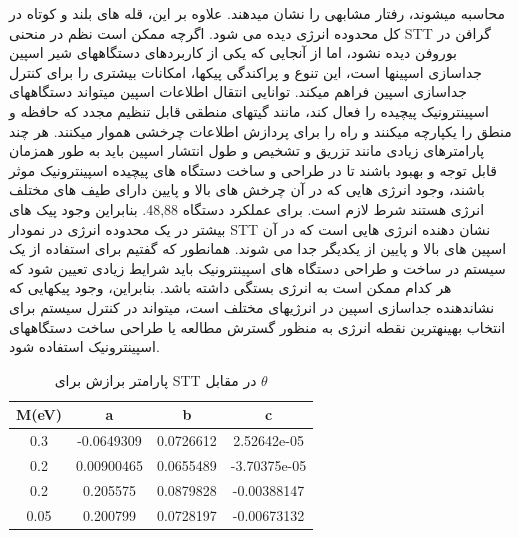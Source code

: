 محاسبه میشوند، رفتار مشابهی را نشان میدهند. علاوه بر این، قله های بلند و کوتاه در کل محدوده انرژی دیده می شود. اگرچه ممکن است نظم در منحنی STT گرافن در بوروفن دیده نشود، اما از آنجایی که یکی از کاربردهای دستگاههای شیر اسپین جداسازی اسپینها است، این تنوع و پراکندگی پیکها، امکانات بیشتری را برای کنترل جداسازی اسپین فراهم میکند. توانایی انتقال اطلاعات اسپین میتواند دستگاههای اسپینترونیک پیچیده را فعال کند، مانند گیتهای منطقی قابل تنظیم مجدد که حافظه و منطق را یکپارچه میکنند و راه را برای پردازش اطلاعات چرخشی هموار میکنند. هر چند پارامترهای زیادی مانند تزریق و تشخیص و طول انتشار اسپین باید به طور همزمان قابل توجه و بهبود باشند تا در طراحی و ساخت دستگاه های پیچیده اسپینترونیک موثر باشند، وجود انرژی هایی که در آن چرخش های بالا و پایین دارای طیف های مختلف انرژی هستند شرط لازم است. برای عملکرد دستگاه 48,88. بنابراین وجود پیک های بیشتر در یک محدوده انرژی در نمودار STT نشان دهنده انرژی هایی است که در آن اسپین های بالا و پایین از یکدیگر جدا می شوند. همانطور که گفتیم برای استفاده از یک سیستم در ساخت و طراحی دستگاه های اسپینترونیک باید شرایط زیادی تعیین شود که هر کدام ممکن است به انرژی بستگی داشته باشد. بنابراین، وجود پیکهایی که نشاندهنده جداسازی اسپین در انرژیهای مختلف است، میتواند در کنترل سیستم برای انتخاب بهینهترین نقطه انرژی به منظور گسترش مطالعه یا طراحی ساخت دستگاههای اسپینترونیک استفاده شود.
\begin{table}[t]
  \caption{ پارامتر برازش برای STT در مقابل $\theta$}
  \begin{latin}
    \centering
      \label{tbl:fitting}
      \begin{tabular}{cccc}
        \toprule
        M(eV) & a & b & c \\
        \midrule
        0.3 & -0.0649309 & 0.0726612 & 2.52642e-05 \\
        0.2 & 0.00900465 & 0.0655489 & -3.70375e-05 \\
        0.2 & 0.205575 & 0.0879828 & -0.00388147 \\
        0.05 & 0.200799 & 0.0728197 & -0.00673132 \\
        \bottomrule
      \end{tabular}
    \end{latin}
  \end{table}
